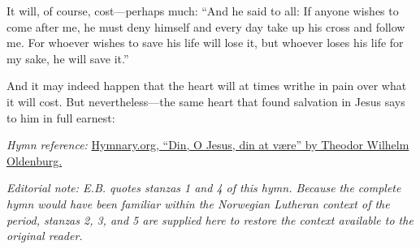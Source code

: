 It will, of course, cost—perhaps much: “And he said to all: If anyone wishes to come after me, he must deny himself and every day take up his cross and follow me. For whoever wishes to save his life will lose it, but whoever loses his life for my sake, he will save it.”

And it may indeed happen that the heart will at times writhe in pain over what it will cost. But nevertheless—the same heart that found salvation in Jesus says to him in full earnest:

\noindent\textit{Hymn reference:}
\href{https://hymnary.org/text/din_o_jesus_din_at_vaere}
{Hymnary.org, ``Din, O Jesus, din at være'' by Theodor Wilhelm Oldenburg.}

\smallskip

\noindent\textit{Editorial note: E.B. quotes stanzas 1 and 4 of this hymn. Because the complete hymn would have been familiar within the Norwegian Lutheran context of the period, stanzas 2, 3, and 5 are supplied here to restore the context available to the original reader.}


